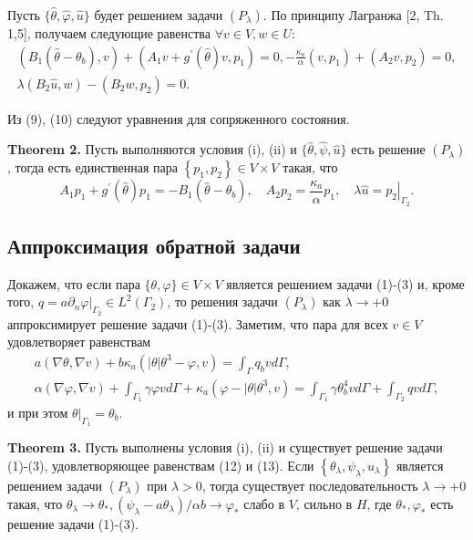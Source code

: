 Пусть $\{\widehat{\theta}, \widehat{\varphi}, \widehat{u}\}$
будет решением задачи $\left(P_{\lambda}\right)$.
По принципу Лагранжа $[2$, Th. 1,5],
получаем следующие равенства $\forall v \in V, w \in U$:
\[
    \begin{gathered}
        \left(B_{1}\left(\widehat{\theta}-\theta_{b}\right), v\right)+\left(A_{1} v
        +g^{\prime}(\widehat{\theta}) v, p_{1}\right)=0,
        -\frac{\kappa_{a}}{\alpha}\left(v, p_{1}\right)+\left(A_{2} v, p_{2}\right)=0, \\
        \lambda\left(B_{2} \widehat{u}, w\right)-\left(B_{2} w, p_{2}\right)=0 .
    \end{gathered}
\]

Из (9), (10) следуют уравнения для сопряженного состояния.

\textbf{Theorem 2.}
Пусть выполняются условия (i), (ii) и
$\{\widehat{\theta}, \widehat{\psi}, \widehat{u}\}$
есть решение $\left(P_{\lambda}\right)$,
тогда есть единственная пара $\left\{p_{1}, p_{2}\right\} \in V \times V$ такая, что
\[
    A_{1} p_{1}+g^{\prime}(\widehat{\theta}) p_{1}=-B_{1}\left(\widehat{\theta}-\theta_{b}\right),
    \quad A_{2} p_{2}=\frac{\kappa_{a}}{\alpha} p_{1}, \quad \lambda \widehat{u}=\left.p_{2}\right|_{\Gamma_{2}}.
\]

\subsection{Аппроксимация обратной задачи}
Докажем, что если пара $\{\theta, \varphi\} \in V \times V$ является решением задачи (1)-(3) и,
кроме того, $q=\left.a \partial_ {n} \varphi\right|_{\Gamma_{2}} \in L^{2}\left(\Gamma_{2}\right)$,
то решения задачи $\left(P_{\lambda} \right)$ как $\lambda \rightarrow+0$ аппроксимирует решение задачи (1)-(3).
Заметим, что пара для всех $v \in V$ удовлетворяет равенствам
\[
    \begin{gathered}
        a(\nabla \theta, \nabla v)+b \kappa_{a}\left(|\theta| \theta^{3}-\varphi, v\right)=\int_{\Gamma} q_{b} v d \Gamma, \\
        \alpha(\nabla \varphi, \nabla v)+\int_{\Gamma_{1}} \gamma \varphi v d
        \Gamma+\kappa_{a}\left(\varphi-|\theta| \theta^{3}, v\right)=\int_{\Gamma_{1}} \gamma \theta_{b}^{4} v d
        \Gamma+\int_{\Gamma_{2}} q v d \Gamma,
    \end{gathered}
\]
и при этом $\left.\theta\right|_{\Gamma_{1}}=\theta_{b}$.

\textbf{Theorem 3.}
Пусть выполнены условия (i), (ii) и существует решение задачи (1)-(3), удовлетворяющее равенствам (12) и (13).
Если $\left\{\theta_{\lambda}, \psi_{\lambda}, u_{\lambda}\right\}$
является решением задачи $\left(P_{\lambda}\right)$ при $\lambda>0$,
тогда существует последовательность $\lambda \rightarrow+0$
такая, что $\theta_{\lambda} \rightarrow \theta_{*},
\left(\psi_{\lambda}-a \theta_{\lambda}\right) / \alpha b \rightarrow \varphi_{*}$
слабо в $V$, сильно в $H$, где $\theta_{*}, \varphi_{*}$ есть решение задачи (1)-(3).
